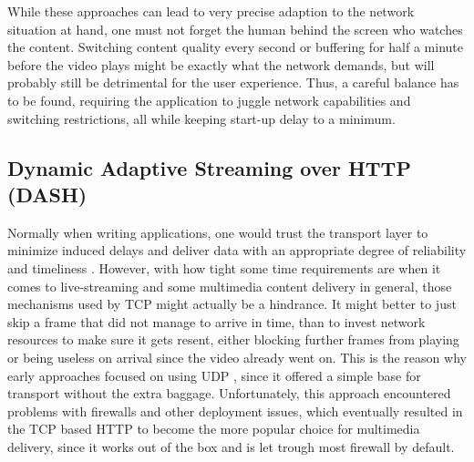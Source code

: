 While these approaches can lead to very precise adaption to the network situation at hand, one must not forget the human behind the screen who watches the content. Switching content quality every second or buffering for half a minute before the video plays might be exactly what the network demands, but will probably still be detrimental for the user experience. Thus, a careful balance has to be found, requiring the application to juggle network capabilities and switching restrictions, all while keeping start-up delay to a minimum.

\subsection{Dynamic Adaptive Streaming over HTTP (DASH)}

Normally when writing applications, one would trust the transport layer to minimize induced delays and deliver data with an appropriate degree of reliability and timeliness \cite{KuAB17}. However, with how tight some time requirements are when it comes to live-streaming and some multimedia content delivery in general, those mechanisms used by TCP \cite{Poot81} might actually be a hindrance. It might better to just skip a frame that did not manage to arrive in time, than to invest network resources to make sure it gets resent, either blocking further frames from playing or being useless on arrival since the video already went on. This is the reason why early approaches focused on using UDP \cite{Poot80}, since it offered a simple base for transport without the extra baggage. Unfortunately, this approach encountered problems with firewalls and other deployment issues, which eventually resulted in the TCP based HTTP \cite{BePT15} to become the more popular choice for multimedia delivery, since it works out of the box and is let trough most firewall by default.  

 
